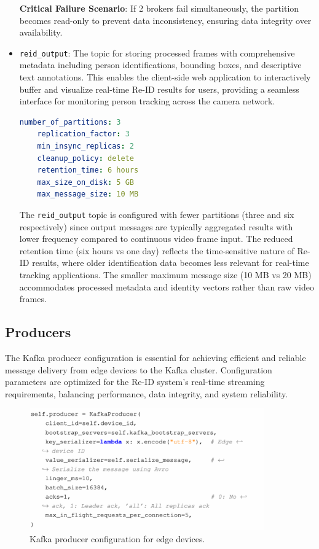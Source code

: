 \begin{itemize}
    \textbf{Critical Failure Scenario}: If 2 brokers fail simultaneously, the partition becomes read-only to prevent data inconsistency, ensuring data integrity over availability.
    
    \item \texttt{reid\_output}: The topic for storing processed frames with comprehensive metadata including person identifications, bounding boxes, and descriptive text annotations. This enables the client-side web application to interactively buffer and visualize real-time Re-ID results for users, providing a seamless interface for monitoring person tracking across the camera network.
    
    \begin{lstlisting}[language=yaml]
    number_of_partitions: 3
    replication_factor: 3
    min_insync_replicas: 2
    cleanup_policy: delete
    retention_time: 6 hours
    max_size_on_disk: 5 GB
    max_message_size: 10 MB
    \end{lstlisting}
    
    The \texttt{reid\_output} topic is configured with fewer partitions (three and six respectively) since output messages are typically aggregated results with lower frequency compared to continuous video frame input. The reduced retention time (six hours vs one day) reflects the time-sensitive nature of Re-ID results, where older identification data becomes less relevant for real-time tracking applications. The smaller maximum message size (10 MB vs 20 MB) accommodates processed metadata and identity vectors rather than raw video frames.
\end{itemize}

\subsection{Producers}

The Kafka producer configuration is essential for achieving efficient and reliable message delivery from edge devices to the Kafka cluster. Configuration parameters are optimized for the Re-ID system's real-time streaming requirements, balancing performance, data integrity, and system reliability.

\begin{figure}[htbp]
    \centering
    \includegraphics[width=0.9\textwidth]{Figure/producer_conf.png}
    \caption{Kafka producer configuration for edge devices.}
    \label{fig:producer_config}
\end{figure}

